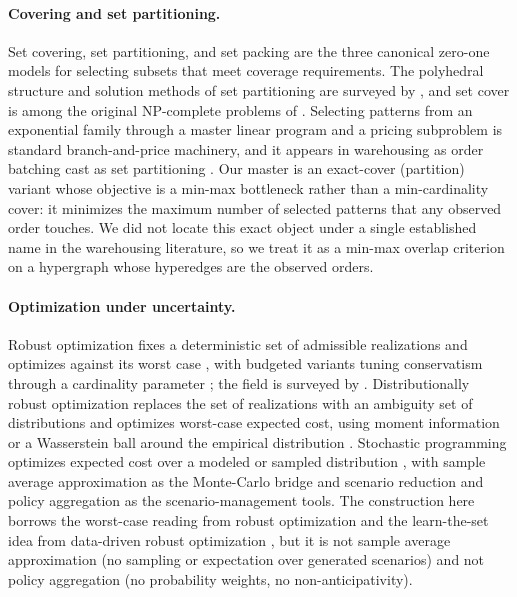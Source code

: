 \documentclass[preprint,review,11pt,authoryear]{elsarticle}
\begin{document}
\paragraph{Covering and set partitioning.}
Set covering, set partitioning, and set packing are the three canonical zero-one models for selecting subsets that meet coverage requirements. The polyhedral structure and solution methods of set partitioning are surveyed by \citet{balas1976}, and set cover is among the original NP-complete problems of \citet{karp1972}. Selecting patterns from an exponential family through a master linear program and a pricing subproblem is standard branch-and-price machinery, and it appears in warehousing as order batching cast as set partitioning \citep{gademann2005}. Our master is an exact-cover (partition) variant whose objective is a min-max bottleneck rather than a min-cardinality cover: it minimizes the maximum number of selected patterns that any observed order touches. We did not locate this exact object under a single established name in the warehousing literature, so we treat it as a min-max overlap criterion on a hypergraph whose hyperedges are the observed orders.

\paragraph{Optimization under uncertainty.}
Robust optimization fixes a deterministic set of admissible realizations and optimizes against its worst case \citep{bental1999}, with budgeted variants tuning conservatism through a cardinality parameter \citep{bertsimas2004}; the field is surveyed by \citet{bbc2011}. Distributionally robust optimization replaces the set of realizations with an ambiguity set of distributions and optimizes worst-case expected cost, using moment information \citep{delage2010} or a Wasserstein ball around the empirical distribution \citep{esfahani2018}. Stochastic programming optimizes expected cost over a modeled or sampled distribution \citep{birge2011}, with sample average approximation as the Monte-Carlo bridge \citep{kleywegt2002} and scenario reduction \citep{heitsch2003} and policy aggregation \citep{rockafellar1991} as the scenario-management tools. The construction here borrows the worst-case reading from robust optimization and the learn-the-set idea from data-driven robust optimization \citep{bgk2018}, but it is not sample average approximation (no sampling or expectation over generated scenarios) and not policy aggregation (no probability weights, no non-anticipativity).
\end{document}
